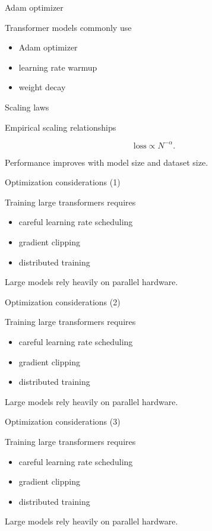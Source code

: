 \documentclass[aspectratio=169]{beamer}
\begin{document}
\begin{frame}{Adam optimizer}

Transformer models commonly use

\begin{itemize}
\item Adam optimizer
\item learning rate warmup
\item weight decay
\end{itemize}

\end{frame}


\begin{frame}{Scaling laws}

Empirical scaling relationships

\[
\text{loss} \propto N^{-\alpha}.
\]

Performance improves with model size and dataset size.

\end{frame}


\begin{frame}{Optimization considerations (1)}

Training large transformers requires

\begin{itemize}
\item careful learning rate scheduling
\item gradient clipping
\item distributed training
\end{itemize}

Large models rely heavily on parallel hardware.

\end{frame}


\begin{frame}{Optimization considerations (2)}

Training large transformers requires

\begin{itemize}
\item careful learning rate scheduling
\item gradient clipping
\item distributed training
\end{itemize}

Large models rely heavily on parallel hardware.

\end{frame}


\begin{frame}{Optimization considerations (3)}

Training large transformers requires

\begin{itemize}
\item careful learning rate scheduling
\item gradient clipping
\item distributed training
\end{itemize}

Large models rely heavily on parallel hardware.

\end{frame}
\end{document}
